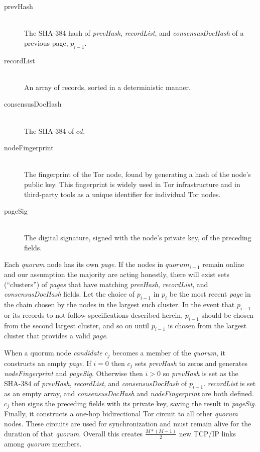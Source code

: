 \begin{description}
	\item[prevHash] \hfill \\
		The SHA-384 hash of \emph{prevHash}, \emph{recordList}, and \emph{consensusDocHash} of a previous page, $ p_{i - 1} $.
	\item[recordList] \hfill \\
		An array of records, sorted in a deterministic manner.
	\item[consensusDocHash] \hfill \\
		The SHA-384 of $ cd $.
	\item[nodeFingerprint] \hfill \\
		The fingerprint of the Tor node, found by generating a hash of the node's public key. This fingerprint is widely used in Tor infrastructure and in third-party tools as a unique identifier for individual Tor nodes.
	\item[pageSig] \hfill \\
		The digital signature, signed with the node's private key, of the preceding fields.
\end{description}

Each \emph{quorum} node has its own \emph{page}. If the nodes in $ quorum_{i - 1} $ remain online and our assumption the majority are acting honestly, there will exist sets (``clusters'') of \emph{pages} that have matching \emph{prevHash}, \emph{recordList}, and \emph{consensusDocHash} fields. Let the choice of $ p_{i - 1} $ in $ p_{i} $ be the most recent \emph{page} in the chain chosen by the nodes in the largest such cluster. In the event that $ p_{i - 1} $ or its records to not follow specifications described herein, $ p_{i - 1} $ should be chosen from the second largest cluster, and so on until $ p_{i - 1} $ is chosen from the largest cluster that provides a valid \emph{page}.

When a quorum node \emph{candidate} $ c_{j} $ becomes a member of the \emph{quorum}, it constructs an empty \emph{page}. If $ i = 0 $ then $ c_{j} $ sets \emph{prevHash} to zeros and generates \emph{nodeFingerprint} and \emph{pageSig}. Otherwise then $ i > 0 $ so \emph{prevHash} is set as the SHA-384 of \emph{prevHash}, \emph{recordList}, and \emph{consensusDocHash} of $ p_{i - 1} $. \emph{recordList} is set as an empty array, and \emph{consensusDocHash} and \emph{nodeFingerprint} are both defined. $ c_{j} $ then signs the preceding fields with its private key, saving the result in \emph{pageSig}. Finally, it constructs a one-hop bidirectional Tor circuit to all other \emph{quorum} nodes. These circuits are used for synchronization and must remain alive for the duration of that \emph{quorum}. Overall this creates $ \frac{M * (M - 1)}{2} $ new TCP/IP links among \emph{quorum} members.


